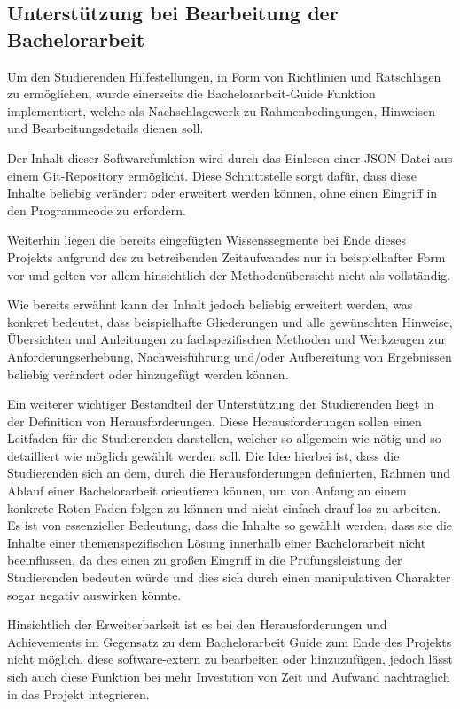 \documentclass[bibliography=totoc,listof=totoc,BCOR=5mm,DIV=12,oneside]{scrbook}
\begin{document}
{\subsection{Unterstützung bei Bearbeitung der Bachelorarbeit}
\par Um den Studierenden Hilfestellungen, in Form von Richtlinien und Ratschlägen zu ermöglichen, wurde einerseits die Bachelorarbeit-Guide Funktion implementiert, welche als Nachschlagewerk zu Rahmenbedingungen, Hinweisen und Bearbeitungsdetails dienen soll. 
\par Der Inhalt dieser Softwarefunktion wird durch das Einlesen einer JSON-Datei aus einem Git-Repository ermöglicht. Diese Schnittstelle sorgt dafür, dass diese Inhalte beliebig verändert oder erweitert werden können, ohne einen Eingriff in den Programmcode zu erfordern.
\par Weiterhin liegen die bereits eingefügten Wissenssegmente bei Ende dieses Projekts aufgrund des zu betreibenden Zeitaufwandes nur in beispielhafter Form vor und gelten vor allem hinsichtlich der Methodenübersicht nicht als vollständig.
\par Wie bereits erwähnt kann der Inhalt jedoch beliebig erweitert werden, was konkret bedeutet, dass  beispielhafte Gliederungen und alle gewünschten Hinweise, Übersichten und Anleitungen zu fachspezifischen Methoden und Werkzeugen zur Anforderungserhebung, Nachweisführung und/oder Aufbereitung von Ergebnissen beliebig verändert oder hinzugefügt werden können.
\par \bigskip Ein weiterer wichtiger Bestandteil der Unterstützung der Studierenden liegt in der Definition von Herausforderungen. Diese Herausforderungen sollen einen Leitfaden für die Studierenden darstellen, welcher so allgemein wie nötig und so detailliert wie möglich gewählt werden soll. Die Idee hierbei ist, dass die Studierenden sich an dem, durch die Herausforderungen definierten, Rahmen und Ablauf einer Bachelorarbeit orientieren können, um von Anfang an einem konkrete Roten Faden folgen zu können und nicht \grqq einfach drauf los\grqq{} zu arbeiten. Es ist von essenzieller Bedeutung, dass die Inhalte so gewählt werden, dass  sie die Inhalte einer themenspezifischen Lösung innerhalb einer Bachelorarbeit nicht beeinflussen, da dies einen zu großen Eingriff in die Prüfungsleistung der Studierenden bedeuten würde und dies sich durch einen manipulativen Charakter sogar negativ auswirken könnte.
\par Hinsichtlich der Erweiterbarkeit ist es bei den Herausforderungen und Achievements im Gegensatz zu dem Bachelorarbeit Guide zum Ende des Projekts nicht möglich, diese software-extern zu bearbeiten oder hinzuzufügen, jedoch lässt sich auch diese Funktion bei mehr Investition von Zeit und Aufwand nachträglich in das Projekt integrieren.

}
\end{document}

